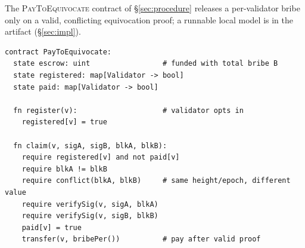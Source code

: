 The \textsc{PayToEquivocate} contract of \S\ref{sec:procedure} releases a per-validator bribe only on a
valid, conflicting equivocation proof; a runnable local model is in the artifact (\S\ref{sec:impl}).

\begin{lstlisting}[caption={Trustless bribery escrow (model).},label={lst:contract}]
contract PayToEquivocate:
  state escrow: uint                 # funded with total bribe B
  state registered: map[Validator -> bool]
  state paid: map[Validator -> bool]

  fn register(v):                    # validator opts in
    registered[v] = true

  fn claim(v, sigA, sigB, blkA, blkB):
    require registered[v] and not paid[v]
    require blkA != blkB
    require conflict(blkA, blkB)     # same height/epoch, different value
    require verifySig(v, sigA, blkA)
    require verifySig(v, sigB, blkB)
    paid[v] = true
    transfer(v, bribePer())          # pay after valid proof
\end{lstlisting}
